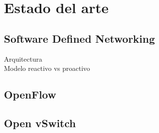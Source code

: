 \chapter{Estado del arte}

\graphicspath{{Chapter2/Figs/}}

\section{Software Defined Networking}
Arquitectura \\
Modelo reactivo vs proactivo \\



\section{OpenFlow}



\section{Open vSwitch}








